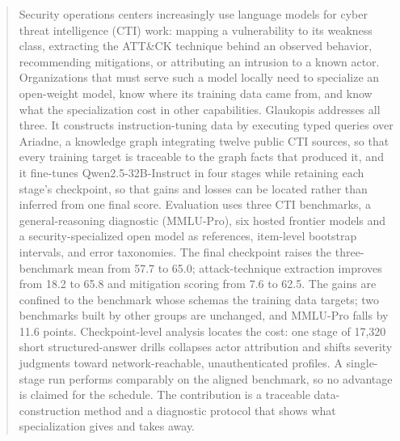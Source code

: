 \documentclass[twocolumn]{svjour3}
\begin{document}
\begin{abstract}
Security operations centers increasingly use language models for cyber threat intelligence (CTI) work: mapping a vulnerability to its weakness class, extracting the ATT\&CK technique behind an observed behavior, recommending mitigations, or attributing an intrusion to a known actor. Organizations that must serve such a model locally need to specialize an open-weight model, know where its training data came from, and know what the specialization cost in other capabilities. Glaukopis addresses all three. It constructs instruction-tuning data by executing typed queries over Ariadne, a knowledge graph integrating twelve public CTI sources, so that every training target is traceable to the graph facts that produced it, and it fine-tunes Qwen2.5-32B-Instruct in four stages while retaining each stage's checkpoint, so that gains and losses can be located rather than inferred from one final score. Evaluation uses three CTI benchmarks, a general-reasoning diagnostic (MMLU-Pro), six hosted frontier models and a security-specialized open model as references, item-level bootstrap intervals, and error taxonomies. The final checkpoint raises the three-benchmark mean from 57.7 to 65.0; attack-technique extraction improves from 18.2 to 65.8 and mitigation scoring from 7.6 to 62.5. The gains are confined to the benchmark whose schemas the training data targets; two benchmarks built by other groups are unchanged, and MMLU-Pro falls by 11.6 points. Checkpoint-level analysis locates the cost: one stage of 17,320 short structured-answer drills collapses actor attribution and shifts severity judgments toward network-reachable, unauthenticated profiles. A single-stage run performs comparably on the aligned benchmark, so no advantage is claimed for the schedule. The contribution is a traceable data-construction method and a diagnostic protocol that shows what specialization gives and takes away.
\end{abstract}
\end{document}
